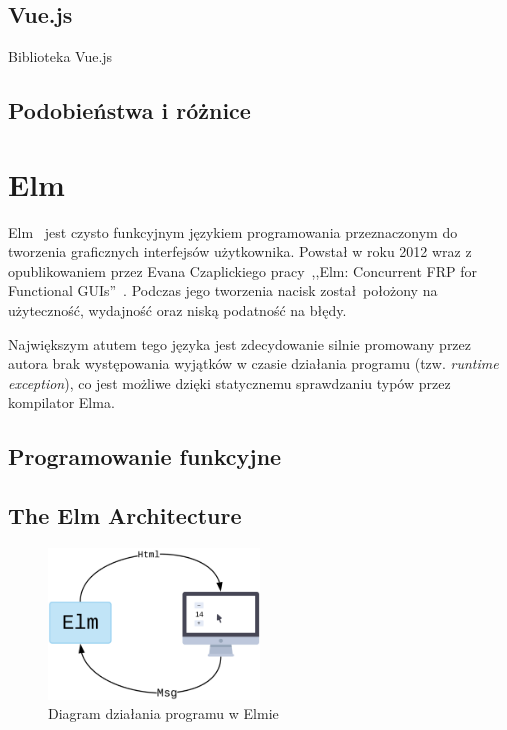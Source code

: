 \documentclass[twoside,a4paper]{report}
\begin{document}
\section{Vue.js}
Biblioteka Vue.js~\cite{vuejsdocs}
\section{Podobieństwa i różnice}


\chapter{Elm}
Elm~\cite{elmdocs} jest czysto funkcyjnym językiem programowania przeznaczonym do tworzenia graficznych interfejsów użytkownika.
Powstał w roku 2012 wraz z opublikowaniem przez Evana Czaplickiego pracy~,,Elm: Concurrent FRP for Functional GUIs''~\cite{Czaplicki2012ElmC}.
Podczas jego tworzenia nacisk został położony na użyteczność, wydajność oraz niską podatność na błędy.

Największym atutem tego języka jest zdecydowanie silnie promowany przez autora brak występowania wyjątków w czasie działania programu (tzw. \textit{runtime exception}), co jest możliwe dzięki statycznemu sprawdzaniu typów przez kompilator Elma.

\section{Programowanie funkcyjne}

\section{The Elm Architecture}
\begin{figure}[H]
    \centering
    \includegraphics[width=0.5\textwidth]{elm_arch.png}
    \caption{Diagram działania programu w Elmie}\label{fig:elm_arch}
\end{figure}
\end{document}
